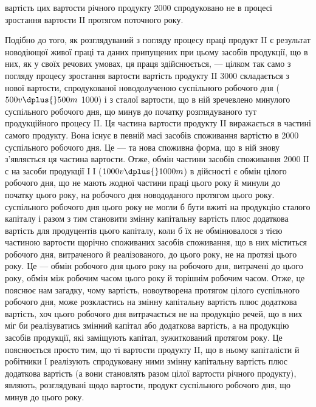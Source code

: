 \parcont{}  %
вартість цих  вартости річного продукту \deq{} 2000 спродуковано не
в процесі зростання вартости II протягом поточного року.

Подібно до того, як розглядуваний з погляду процесу праці продукт
II є результат новодіющої живої праці та даних припущених при цьому
засобів продукції, що в них, як у своїх речових умовах, ця праця здійснюється,
— цілком так само з погляду процесу зростання вартости вартість
продукту II \deq{} 3000 складається з нової вартости, спродукованої новодолученою
 суспільного робочого дня ($500 v \dplus{} 500m$ \deq{} 1000) і з сталої
вартости, що в ній зречевлено  минулого суспільного робочого дня,
що минув до початку розглядуваного тут продукційного процесу II. Ця
частина вартости продукту II виражається в частині самого продукту.
Вона існує в певній масі засобів споживання вартістю в 2000 \deq{}  суспільного
робочого дня. Це — та нова споживна форма, що в ній знову
з’являється ця частина вартости. Отже, обмін частини засобів споживання \deq{}
2000 ІІ с на засоби продукції І \deq{} І ($1000 v \dplus{} 1000 m$) в дійсності є обмін
 цілого робочого дня, що не мають жодної частини праці цього року
й минули до початку цього року, на  робочого дня новододаного протягом
цього року.  суспільного робочого дня цього року не могли б
бути вжиті на продукцію сталого капіталу і разом з тим становити змінну
капітальну вартість плюс додаткова вартість для продуцентів цього капіталу,
коли б їх не обмінювалося з тією частиною вартости щорічно
споживаних засобів споживання, що в них міститься  робочого дня,
витраченого й реалізованого, до цього року, не на протязі цього
року. Це — обмін  робочого дня цього року на  робочого дня,
витрачені до цього року, обмін між робочим часом цього року й
торішнім робочим часом. Отже, це пояснює нам загадку, чому вартість,
новоутворена протягом цілого суспільного робочого дня, може розкластись
на змінну капітальну вартість плюс додаткова вартість, хоч
 цього робочого дня витрачається не на продукцію речей, що в
них міг би реалізуватись змінний капітал або додаткова вартість, а
на продукцію засобів продукції, які заміщують капітал, зужиткований
протягом року. Це пояснюється просто тим, що ті  вартости продукту
II, що в ньому капіталісти й робітники І реалізують спродуковану
ними змінну капітальну вартість плюс додаткова вартість (а вони
становлять разом  цілої вартости річного продукту), являють, розглядувані
щодо вартости, продукт  суспільного робочого дня, що
минув до цього року.

